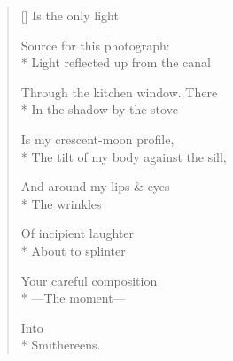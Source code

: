 \label{ch:venezia}
\settowidth{\versewidth}{The tilt of my body against the sill,}
\begin{verse}[\versewidth]
\hspace*{2\vgap} Is the only light

Source for this photograph:\\*
Light reflected up from the canal

Through the kitchen window. \qquad There\\*
In the shadow by the stove

Is my crescent-moon profile,\\*
The tilt of my body against the sill,

And around my lips \& eyes\\*
The wrinkles

Of incipient laughter\\*
About to splinter

Your careful composition\\*
---The moment---

\hspace*{3\vgap} Into\\*
Smithereens.
\end{verse}
